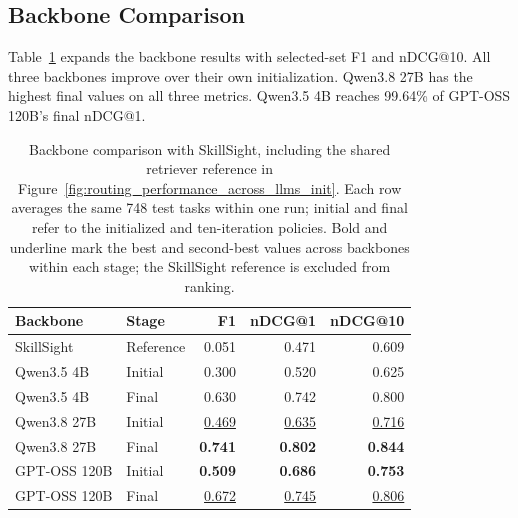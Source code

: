 \subsection{Backbone Comparison}
Table~\ref{tab:app-backbone} expands the backbone results with selected-set F1 and nDCG@10. All three backbones improve over their own initialization. Qwen3.8 27B has the highest final values on all three metrics. Qwen3.5 4B reaches 99.64\% of GPT-OSS 120B's final nDCG@1.

\begin{table}[t]
\centering
\small
\begin{tabular}{llrrr}
\toprule
Backbone & Stage & F1 & nDCG@1 & nDCG@10 \\
\midrule
SkillSight & Reference & 0.051 & 0.471 & 0.609 \\
\midrule
Qwen3.5 4B & Initial & 0.300 & 0.520 & 0.625 \\
Qwen3.5 4B & Final & 0.630 & 0.742 & 0.800 \\
Qwen3.8 27B & Initial & \underline{0.469} & \underline{0.635} & \underline{0.716} \\
Qwen3.8 27B & Final & \textbf{0.741} & \textbf{0.802} & \textbf{0.844} \\
GPT-OSS 120B & Initial & \textbf{0.509} & \textbf{0.686} & \textbf{0.753} \\
GPT-OSS 120B & Final & \underline{0.672} & \underline{0.745} & \underline{0.806} \\
\bottomrule
\end{tabular}
\caption{Backbone comparison with SkillSight, including the shared retriever reference in Figure~\ref{fig:routing_performance_across_llms_init}. Each row averages the same 748 test tasks within one run; initial and final refer to the initialized and ten-iteration policies. Bold and underline mark the best and second-best values across backbones within each stage; the SkillSight reference is excluded from ranking.}
\label{tab:app-backbone}
\end{table}
